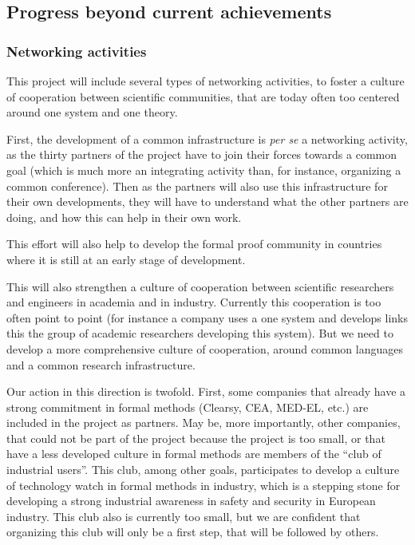 \subsection{Progress beyond current achievements}

\subsubsection*{Networking activities}

This project will include several types of networking activities, to
foster a culture of cooperation between scientific communities, that
are today often too centered around one system and one theory.

First, the development of a common infrastructure is \emph{per se} a
networking activity, as the thirty partners of the project have to join
their forces towards a common goal (which is much more an integrating
activity than, for instance, organizing a common conference). Then as
the partners will also use this infrastructure for their own
developments, they will have to understand what the other partners are
doing, and how this can help in their own work.

This effort will also help to develop the formal proof community in
countries where it is still at an early stage of development.

This will also strengthen a culture of cooperation between scientific
researchers and engineers in academia and in industry. Currently this
cooperation is too often point to point (for instance a company uses a
one system and develops links this the group of academic researchers
developing this system). But we need to develop a more comprehensive
culture of cooperation, around common languages and a common research
infrastructure.

Our action in this direction is twofold. First, some companies that
already have a strong commitment in formal methods (Clearsy, CEA,
MED-EL, etc.) are included in the project as partners. May be, more
importantly, other companies, that could not be part of the project
because the project is too small, or that have a less developed
culture in formal methods are members of the ``club of industrial
users''. This club, among other goals, participates to develop a
culture of technology watch in formal methods in industry, which is a
stepping stone for developing a strong industrial awareness in safety
and security in European industry. This club also is currently too
small, but we are confident that organizing this club will only be a
first step, that will be followed by others.

